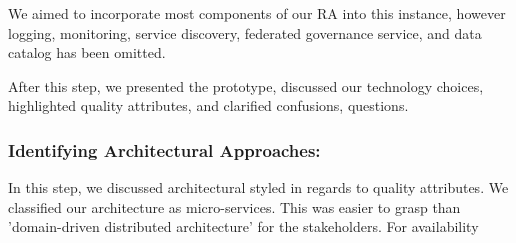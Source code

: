 \documentclass[runningheads]{llncs}
\begin{document}
We aimed to incorporate most components of our RA into this instance, however logging, monitoring, service discovery, federated governance service, and data catalog has been omitted. 

After this step, we presented the prototype, discussed our technology choices, highlighted quality attributes, and clarified confusions, questions. 

\subsubsection{Identifying Architectural Approaches:}

In this step, we discussed architectural styled in regards to quality attributes. We classified our architecture as micro-services. This was easier to grasp than 'domain-driven distributed architecture' for the stakeholders. For availability

%
%



\end{document}
